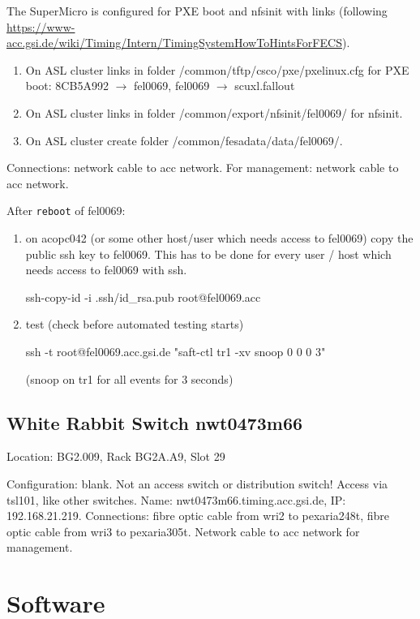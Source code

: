 \documentclass[12pt,a4paper]{report}
\begin{document}
The SuperMicro is configured for PXE boot and nfsinit with links (following
\url{https://www-acc.gsi.de/wiki/Timing/Intern/TimingSystemHowToHintsForFECS}).
\begin{enumerate}
\item On ASL cluster links in folder /common/tftp/csco/pxe/pxelinux.cfg for PXE boot:
8CB5A992 $\to$ fel0069,
fel0069 $\to$ scuxl.fallout
\item On ASL cluster links in folder /common/export/nfsinit/fel0069/ for nfsinit.
\item On ASL cluster create folder /common/fesadata/data/fel0069/.
\end{enumerate}
Connections: network cable to acc network. For management: network cable to acc network.

After \texttt{reboot} of fel0069:
\begin{enumerate}
\item on acopc042 (or some other host/user which needs access to fel0069) copy the public ssh key to fel0069.
This has to be done for every user / host which needs access to fel0069 with ssh.\raggedright
\linebreak ssh-copy-id -i .ssh/id\_rsa.pub root@fel0069.acc

\item test (check before automated testing starts)\raggedright
\linebreak ssh -t root@fel0069.acc.gsi.de "saft-ctl tr1 -xv snoop 0 0 0 3"\raggedright
\linebreak (snoop on tr1 for all events for 3 seconds)
\end{enumerate}

\section{White Rabbit Switch nwt0473m66}
Location: BG2.009, Rack BG2A.A9, Slot 29 \raggedright
\linebreak Configuration: blank. Not an access switch or distribution switch!
\linebreak Access via tsl101, like other switches.
\linebreak Name: nwt0473m66.timing.acc.gsi.de,
\linebreak IP: 192.168.21.219.
\linebreak Connections: fibre optic cable from wri2 to pexaria248t, fibre optic cable from wri3 to pexaria305t. Network cable to acc network for management.
\chapter{Software}
\end{document}
